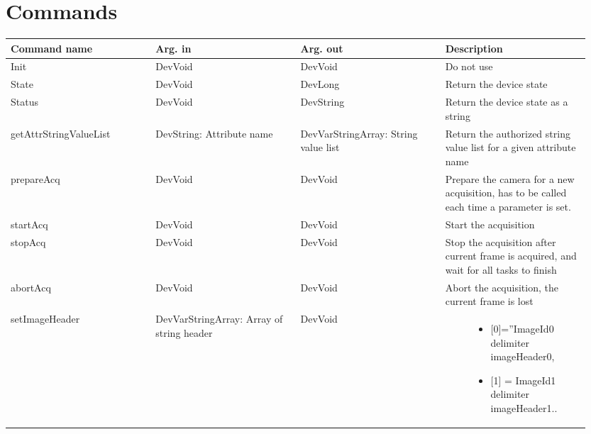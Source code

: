 \documentclass[letterpaper,10pt,english]{sphinxmanual}
\begin{document}
\section{Commands}
\label{LimaDetector/limadetector:commands}
\begin{tabular}{|p{0.237\linewidth}|p{0.237\linewidth}|p{0.237\linewidth}|p{0.237\linewidth}|}
\hline
\textsf{\relax 
\textbf{Command name}
} & \textsf{\relax 
\textbf{Arg. in}
} & \textsf{\relax 
\textbf{Arg. out}
} & \textsf{\relax 
\textbf{Description}
}\\
\hline
Init
 & 
DevVoid
 & 
DevVoid
 & 
Do not use
\\
\hline
State
 & 
DevVoid
 & 
DevLong
 & 
Return the device state
\\
\hline
Status
 & 
DevVoid
 & 
DevString
 & 
Return the device state as a string
\\
\hline
getAttrStringValueList
 & 
DevString:
Attribute name
 & 
DevVarStringArray:
String value list
 & 
Return the authorized string value list for a given attribute name
\\
\hline
prepareAcq
 & 
DevVoid
 & 
DevVoid
 & 
Prepare the camera for a new acquisition, has to be called each time a parameter is set.
\\
\hline
startAcq
 & 
DevVoid
 & 
DevVoid
 & 
Start the acquisition
\\
\hline
stopAcq
 & 
DevVoid
 & 
DevVoid
 & 
Stop the acquisition after current frame is acquired, and wait for all tasks to finish
\\
\hline
abortAcq
 & 
DevVoid
 & 
DevVoid
 & 
Abort the acquisition, the current frame is lost
\\
\hline
setImageHeader
 & 
DevVarStringArray:
Array of string header
 & 
DevVoid
 & \begin{description}
\item[{Set the image header:}] \leavevmode\begin{itemize}
\item {} 
{[}0{]}=''ImageId0 delimiter imageHeader0,

\item {} 
{[}1{]} = ImageId1 delimiter  imageHeader1..

\end{itemize}


\end{description}
\end{tabular}
\end{document}
